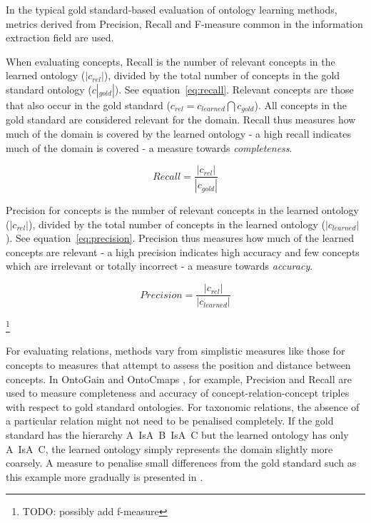 \documentclass[a4paper]{report}
\newcommand{\todo}[1]{\footnote{{\color{red} TODO: #1}}}
\begin{document}
In the typical gold standard-based evaluation of ontology learning methods, metrics derived from Precision, Recall and F-measure common in the information extraction field are used\cite{Wong11Survey}.

When evaluating concepts, Recall is the number of relevant concepts in the learned ontology (\(|c_{rel}|\)), divided by the total number of concepts in the gold standard ontology (\(c|_{gold}|\))\cite{Dellschaft08EvalStrateg}.
See equation~\ref{eq:recall}.
Relevant concepts are those that also occur in the gold standard (\(c_{rel} = c_{learned} \bigcap c_{gold}\)).
All concepts in the gold standard are considered relevant for the domain.
Recall thus measures how much of the domain is covered by the learned ontology - a high recall indicates much of the domain is covered - a measure towards \emph{completeness}.

\begin{equation}
\label{eq:recall}
 Recall = \frac{|c_{rel}|}{|c_{gold}|}
\end{equation}

Precision for concepts is the number of relevant concepts in the learned ontology (\(|c_{rel}|\)), divided by the total number of concepts in the learned ontology (\(|c_{learned}|\))\cite{Dellschaft08EvalStrateg}.
See equation~\ref{eq:precision}.
Precision thus measures how much of the learned concepts are relevant - a high precision indicates high accuracy and few concepts which are irrelevant or totally incorrect - a measure towards \emph{accuracy}.

\begin{equation}
\label{eq:precision}
 Precision = \frac{|c_{rel}|}{|c_{learned}|}
\end{equation}

\todo{possibly add f-measure}

For evaluating relations, methods vary from simplistic measures like those for concepts to measures that attempt to assess the position and distance between concepts.
In OntoGain\cite{Drymonas10OntoGain} and OntoCmaps \cite{Zouaq11OntoCmaps}, for example, Precision and Recall are used to measure completeness and accuracy of concept-relation-concept triples with respect to gold standard ontologies.
For taxonomic relations, the absence of a particular relation might not need to be penalised completely.
If the gold standard has the hierarchy A~IsA~B~IsA~C but the learned ontology has only A~IsA~C, the learned ontology simply represents the domain slightly more coarsely.
A measure to penalise small differences from the gold standard such as this example more gradually is presented in \cite{Hjelm09Thesis}.
\end{document}
